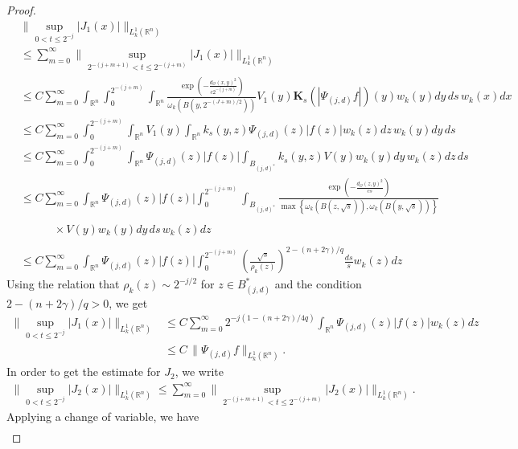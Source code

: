 \documentclass[11pt, reqno]{amsproc}
\theoremstyle{definition}
\theoremstyle{remark}
\numberwithin{equation}{section}
\begin{document}
\begin{proof}
\begin{align*}
    & \Bigg\| \sup_{0<t\leq 2^{-j}} |J_1(x)|  \Bigg\|_{L_k^1(\mathbb{R}^n)}\\
    & \leq \sum_{m=0}^\infty \Bigg\|  \sup_{2^{-(j+m+1)}<t\leq 2^{-(j+m)}} |J_1(x)|  \Bigg\|_{L_k^1(\mathbb{R}^n)} \\
    & \leq C\sum_{m=0}^\infty \int_{\mathbb{R}^n} \int_0^{2^{-(j+m)}}\int_{\mathbb{R}^n}\frac{\exp\left(-\frac{d_\mathcal{O}(x,y)^2}{c2^{-(j+m)}} \right)}{\omega_k(B(y,2^{-(J+m)/2}))}V_1(y)\mathbf{K}_s(|\Psi_{(j,d)}f|)(y)w_k(y)dy \,ds\,w_k(x)dx\\
    & \leq C \sum_{m=0}^\infty \int_0^{2^{-(j+m)}} \int_{\mathbb{R}^n} V_1(y) \int_{\mathbb{R}^n} k_s(y,z)\Psi_{(j,d)}(z)|f(z)|w_k(z)dz\,w_k(y)dy\,ds \\
    & \leq C \sum_{m=0}^\infty  \int_0^{2^{-(j+m)}} \int_{\mathbb{R}^n} \Psi_{(j,d)}(z)|f(z)| \int_{B_{(j,d)^*}}k_s(y,z)V(y)w_k(y)dy\,w_k(z)dz\,ds\\
    & \leq C \sum_{m=0}^\infty   \int_{\mathbb{R}^n} \Psi_{(j,d)}(z)|f(z)|  \int_0^{2^{-(j+m)}} \int_{B_{(j,d)^*}} \frac{\exp\left( -\frac{d_\mathcal{O}(z,y)^2}{cs} \right)}{\max\left\{ \omega_k(B(z,\sqrt{s})),\omega_k(B(y,\sqrt{s}) )\right\}}\\ \\
    & \quad \quad \quad \times V(y)w_k(y)dy  \, ds\,w_k(z)dz \\ \\
    & \leq C  \sum_{m=0}^\infty  \int_{\mathbb{R}^n} \Psi_{(j,d)}(z)|f(z)|  \int_0^{2^{-(j+m)}} \left( \frac{\sqrt{s}}{\rho_k(z)} \right)^{2-(n+2\gamma)/q} \frac{ds}{s} w_k(z) dz
\end{align*}
Using the relation that $\rho_k(z) \sim 2^{-j/2}$ for $z\in B_{(j,d)}^*$ and the condition $2-(n+2\gamma)/q >0$, we get
\begin{align*}
\Bigg\| \sup_{0<t\leq 2^{-j}} |J_1(x)|  \Bigg\|_{L_k^1(\mathbb{R}^n)}    & \leq C  \sum_{m=0}^\infty 2^{-j(1-(n+2\gamma)/4q)} \int_{\mathbb{R}^n} \Psi_{(j,d)}(z)|f(z)| w_k(z)dz\\
    & \leq C\,\| \Psi_{(j,d)}f\|_{L_k^1(\mathbb{R}^n)}.
\end{align*}  
In order to get the estimate for $J_2$, we write
\begin{align*}
    \Bigg\| \sup_{0<t\leq 2^{-j}} |J_2(x)|  \Bigg\|_{L_k^1(\mathbb{R}^n)}  \leq \sum_{m=0}^\infty  \Bigg\| \sup_{2^{-(j+m+1)}<t\leq 2^{-(j+m)}} |J_2(x)|  \Bigg\|_{L_k^1(\mathbb{R}^n)}.
\end{align*} Applying a change of variable, we have
\begin{align*}

\end{align*}
\end{proof}
\end{document}
